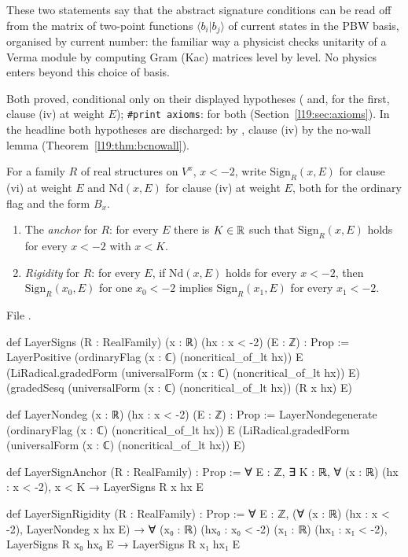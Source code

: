 \begin{physics}
These two statements say that the abstract signature conditions can be read off from the matrix of two-point
functions $\langle b_i|b_j\rangle$ of current states in the PBW basis, organised by current number: the familiar way a
physicist checks unitarity of a Verma module by computing Gram (Kac) matrices level by level. No physics enters
beyond this choice of basis.
\end{physics}

\begin{status}
Both proved, conditional only on their displayed hypotheses ( and, for the first, clause (iv) at weight
$E$); \texttt{\#print axioms}:  for both (Section~\ref{l19:sec:axioms}).
In the headline both hypotheses are discharged:  by , clause (iv) by the
no-wall lemma (Theorem~\ref{l19:thm:bcnowall}).
\end{status}

\begin{definition}\label{l19:def:bcinputs}
For a family $R$ of real structures on $V^x$, $x<-2$, write $\mathrm{Sign}_R(x,E)$ for clause (vi) at weight $E$
and $\mathrm{Nd}(x,E)$ for clause (iv) at weight $E$, both for the ordinary flag and the form $B_x$.
\begin{enumerate}
\item The \emph{anchor} for $R$: for every $E$ there is $K\in\mathbb{R}$ such that $\mathrm{Sign}_R(x,E)$ holds for
  every $x<-2$ with $x<K$.
\item \emph{Rigidity} for $R$: for every $E$, if $\mathrm{Nd}(x,E)$ holds for every $x<-2$, then
  $\mathrm{Sign}_R(x_0,E)$ for one $x_0<-2$ implies $\mathrm{Sign}_R(x_1,E)$ for every $x_1<-2$.
\end{enumerate}
\end{definition}

{\raggedright\noindent File .\par}
\begin{leancode}
def LayerSigns (R : RealFamily) (x : ℝ) (hx : x < -2) (E : ℤ) : Prop :=
  LayerPositive (ordinaryFlag (x : ℂ) (noncritical_of_lt hx)) E
    (LiRadical.gradedForm (universalForm (x : ℂ) (noncritical_of_lt hx)) E)
    (gradedSesq (universalForm (x : ℂ) (noncritical_of_lt hx)) (R x hx) E)

def LayerNondeg (x : ℝ) (hx : x < -2) (E : ℤ) : Prop :=
  LayerNondegenerate (ordinaryFlag (x : ℂ) (noncritical_of_lt hx)) E
    (LiRadical.gradedForm (universalForm (x : ℂ) (noncritical_of_lt hx)) E)

def LayerSignAnchor (R : RealFamily) : Prop :=
  ∀ E : ℤ, ∃ K : ℝ, ∀ (x : ℝ) (hx : x < -2), x < K → LayerSigns R x hx E

def LayerSignRigidity (R : RealFamily) : Prop :=
  ∀ E : ℤ, (∀ (x : ℝ) (hx : x < -2), LayerNondeg x hx E) →
    ∀ (x₀ : ℝ) (hx₀ : x₀ < -2) (x₁ : ℝ) (hx₁ : x₁ < -2),
      LayerSigns R x₀ hx₀ E → LayerSigns R x₁ hx₁ E
\end{leancode}


